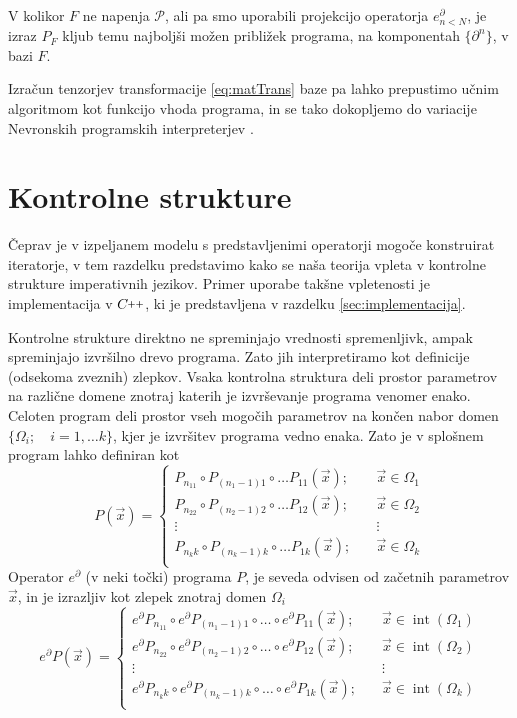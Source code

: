 \documentclass[a4paper, 12pt]{book}
\newcommand{\CC}{C\nolinebreak\hspace{-.05em}\raisebox{.4ex}{\tiny\bf +}\nolinebreak\hspace{-.10em}\raisebox{.4ex}{\tiny\bf +}}
\def\CC{{C\nolinebreak[4]\hspace{-.05em}\raisebox{.4ex}{\tiny\bf ++}}}
\newcommand{\dP}{\mathcal{P}}
\newcommand{\D}{\partial}
\DeclareMathOperator{\interior}{int}
\begin{document}
V kolikor $F$ ne napenja $\dP$, ali pa smo uporabili projekcijo operatorja $e^\D_{n<N}$, je izraz $P_F$ kljub temu najboljši možen približek programa, na komponentah $\{\D^n\}$, v bazi $F$.

Izračun tenzorjev transformacije \eqref{eq:matTrans} baze pa lahko prepustimo učnim algoritmom kot funkcijo vhoda programa, in se tako dokopljemo do variacije Nevronskih programskih interpreterjev \cite{progInterp}.
 
\section{Kontrolne strukture}

Čeprav je v izpeljanem modelu s predstavljenimi operatorji mogoče konstruirat iteratorje, v tem razdelku predstavimo kako se naša teorija vpleta v kontrolne strukture imperativnih jezikov. Primer uporabe takšne vpletenosti je implementacija v $\CC$, ki je predstavljena v razdelku \ref{sec:implementacija}.

Kontrolne strukture direktno ne spreminjajo vrednosti spremenljivk, ampak spreminjajo izvršilno drevo programa. Zato jih interpretiramo kot definicije (odsekoma zveznih) zlepkov. Vsaka kontrolna struktura deli prostor parametrov na različne domene znotraj katerih je izvrševanje programa venomer enako. Celoten program deli prostor vseh mogočih parametrov na končen nabor domen $\{\Omega_i;\quad i=1,\ldots
  k\}$, kjer je izvršitev programa vedno enaka. Zato je v splošnem program lahko definiran kot
\begin{equation}
   \label{eq:zlrprk_splosno}
   P(\vec{x}) =
   \begin{cases}
     P_{n_11}\circ P_{(n_1-1)1}\circ\ldots P_{11}(\vec{x});&\quad \vec{x}\in\Omega_1\\
     P_{n_22}\circ P_{(n_2-1)2}\circ\ldots P_{12}(\vec{x});&\quad \vec{x}\in\Omega_2\\
     \vdots&\quad\vdots\\
     P_{n_kk}\circ P_{(n_k-1)k}\circ\ldots P_{1k}(\vec{x});&\quad \vec{x}\in\Omega_k\\
   \end{cases}
 \end{equation}
 Operator $e^\D$ (v neki točki) programa $P$, je seveda odvisen od začetnih parametrov $\vec{x}$, in je izrazljiv kot zlepek znotraj domen $\Omega_i$
 \begin{equation}
   \label{eq:Dzlrprk_splosno}
   e^\D P({\vec{x}}) =
   \begin{cases}
     e^\D P_{n_11}\circ e^\D P_{(n_1-1)1}\circ\ldots\circ e^\D P_{11}(\vec{x});&\quad \vec{x}\in\interior(\Omega_1)\\
     e^\D P_{n_22}\circ e^\D P_{(n_2-1)2}\circ\ldots\circ e^\D P_{12}(\vec{x});&\quad \vec{x}\in\interior(\Omega_2)\\
     \vdots&\quad\vdots\\
     e^\D P_{n_kk}\circ e^\D P_{(n_k-1)k}\circ\ldots\circ e^\D P_{1k}(\vec{x});&\quad \vec{x}\in\interior(\Omega_k)\\
   \end{cases}
 \end{equation}
\end{document}
